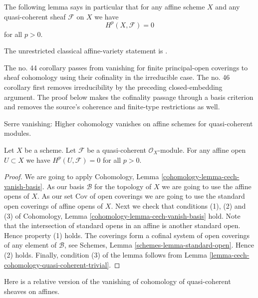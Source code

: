 \noindent
The following lemma says in particular that for any affine scheme
$X$ and any quasi-coherent sheaf $\mathcal{F}$ on $X$ we have
$$
H^p(X, \mathcal{F}) = 0
$$
for all $p > 0$.

\begin{lemma}
\label{lemma-quasi-coherent-affine-cohomology-zero}
\begin{reference}
\cite[Chapter II, \S 3, no. 44, Proposition 7, Corollary 1,
p. 237]{FAC}
The unrestricted classical affine-variety statement is
\cite[Chapter II, \S 3, no. 46, Theorem 3, Corollary 1,
p. 239]{FAC}.
\end{reference}
\begin{history}
The no. 44 corollary passes from vanishing for finite principal-open coverings
to sheaf cohomology using their cofinality in the irreducible case. The no. 46
corollary first removes irreducibility by the preceding closed-embedding
argument. The proof below makes the cofinality passage through a basis
criterion and removes the source's coherence and finite-type restrictions as
well.
\end{history}
\begin{slogan}
Serre vanishing: Higher cohomology vanishes on affine schemes
for quasi-coherent modules.
\end{slogan}
Let $X$ be a scheme.
Let $\mathcal{F}$ be a quasi-coherent $\mathcal{O}_X$-module.
For any affine open $U \subset X$ we have
$H^p(U, \mathcal{F}) = 0$ for all $p > 0$.
\end{lemma}

\begin{proof}
We are going to apply
Cohomology, Lemma \ref{cohomology-lemma-cech-vanish-basis}.
As our basis $\mathcal{B}$ for the topology of $X$ we are going to use
the affine opens of $X$.
As our set $\text{Cov}$ of open coverings we are going to use the standard
open coverings of affine opens of $X$.
Next we check that conditions (1), (2) and (3) of
Cohomology, Lemma \ref{cohomology-lemma-cech-vanish-basis}
hold. Note that the intersection of standard opens in an affine is
another standard open. Hence property (1) holds.
The coverings form a cofinal system of open coverings of any element
of $\mathcal{B}$, see
Schemes, Lemma \ref{schemes-lemma-standard-open}.
Hence (2) holds.
Finally, condition (3) of the lemma follows from
Lemma \ref{lemma-cech-cohomology-quasi-coherent-trivial}.
\end{proof}

\noindent
Here is a relative version of the vanishing of cohomology of quasi-coherent
sheaves on affines.


